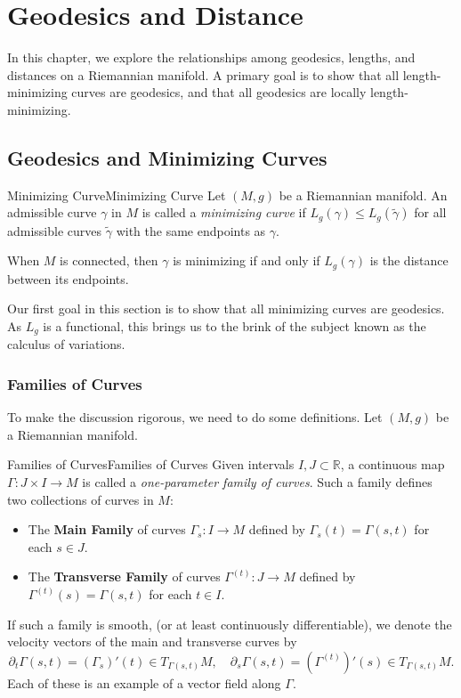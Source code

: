 \documentclass[../main.tex]{subfiles}
\begin{document}
\chapter{Geodesics and Distance}

In this chapter, we explore the relationships among geodesics, lengths, and distances on a Riemannian manifold. A primary goal is to show that all length-minimizing curves are geodesics, and that all geodesics are locally length-minimizing.

\section{Geodesics and Minimizing Curves}
\begin{definition}{Minimizing Curve}{Minimizing Curve}
  Let $(M,g)$ be a Riemannian manifold. An admissible curve $\gamma$ in $M$ is called a \emph{minimizing curve} if $L_g(\gamma) \leq L_g(\tilde{\gamma})$ for all admissible curves $\tilde{\gamma}$ with the same endpoints as $\gamma$.
\end{definition}

When $M$ is connected, then $\gamma$ is minimizing if and only if $L_g(\gamma)$ is the distance between its endpoints.

Our first goal in this section is to show that all minimizing curves are geodesics. As $L_g$ is a functional, this brings us to the brink of the subject known as the calculus of variations.

\subsection{Families of Curves}
To make the discussion rigorous, we need to do some definitions. Let $(M,g)$ be a Riemannian manifold.

\begin{definition}{Families of Curves}{Families of Curves}
  Given intervals $I,J \subset \mathbb{R}$, a continuous map $\Gamma: J \times I \to M$ is called a \emph{one-parameter family of curves}. Such a family defines two collections of curves in $M$:
  \begin{itemize}
    \item The \textbf{Main Family} of curves $\Gamma_s: I \to M$ defined by $\Gamma_s(t) = \Gamma(s,t)$ for each $s \in J$.
    \item The \textbf{Transverse Family} of curves $\Gamma^{(t)}: J \to M$ defined by $\Gamma^{(t)}(s) = \Gamma(s,t)$ for each $t \in I$.
  \end{itemize}
\end{definition}
If such a family is smooth, (or at least continuously differentiable), we denote the velocity vectors of the main and transverse curves by
\begin{equation}
  \partial_t \Gamma(s,t) = (\Gamma_s)'(t) \in T_{\Gamma(s,t)}M, \quad \partial_s \Gamma(s,t) = (\Gamma^{(t)})'(s) \in T_{\Gamma(s,t)}M.
\end{equation}
Each of these is an example of a vector field along $\Gamma$.
\end{document}
